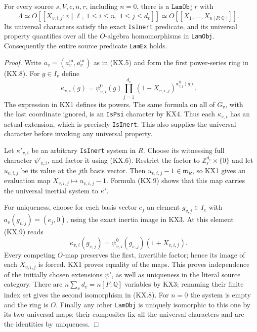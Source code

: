 \begin{theorem}
\label{claim:KX5}
For every source $s,V,c,n,r$, including $n=0$, there is a
$\texttt{LamObj}\,r$ with
\[
 \Lambda\simeq O[[X_{v,i,j}:v\mid\ell,\ 1\le i\le n,
                                      \ 1\le j\le d_v]]
       \simeq O[[X_1,\ldots,X_{n[F:\mathbb Q]}]].
                                                               \tag{KX.8}
\]
Its universal characters satisfy the exact \texttt{IsInert}
predicate, and its universal property quantifies over all the
$O$-algebra homomorphisms in \texttt{LamObj}.
Consequently the entire source predicate \texttt{LamEx} holds.
\end{theorem}
\begin{proof}
Write $a_v=(a_v^{\mathrm{in}},a_v^{\mathrm{ur}})$ as in (KX.5)
and form the first power-series ring in (KX.8).  For $g\in I_v$
define
\[
 \kappa_{v,i}(g)=\psi^0_{v,i}(g)
                    \prod_{j=1}^{d_v}(1+X_{v,i,j})^{
                                                   a^{\mathrm{in}}_{v,j}(g)}.
                                                               \tag{KX.9}
\]
The expression in KX1 defines its powers.  The same formula on all
of $G_v$, with the last coordinate ignored, is an \texttt{IsPsi}
character by KX4.  Thus each $\kappa_{v,i}$ has an actual extension,
which is precisely \texttt{IsInert}.  This also supplies the
universal character before invoking any universal property.

Let $\kappa'_{v,i}$ be an arbitrary \texttt{IsInert} system in
$R$.  Choose its witnessing full character $\psi'_{v,i}$, and
factor it using (KX.6).  Restrict the factor to
$\mathbb Z_\ell^{d_v}\times\{0\}$ and let $u_{v,i,j}$ be its
value at the $j$th basis vector.  Then
$u_{v,i,j}-1\in\mathfrak m_R$, so KX1 gives an evaluation map
$X_{v,i,j}\mapsto u_{v,i,j}-1$.  Formula (KX.9) shows that this
map carries the universal inertial system to $\kappa'$.

For uniqueness, choose for each basis vector $e_j$ an element
$g_{v,j}\in I_v$ with $a_v(g_{v,j})=(e_j,0)$, using the exact
inertia image in KX3.  At this element (KX.9) reads
\[
       \kappa_{v,i}(g_{v,j})
                   =\psi^0_{v,i}(g_{v,j})(1+X_{v,i,j}).
                                                               \tag{KX.10}
\]
Every competing $O$-map preserves the first, invertible factor;
hence its image of each $X_{v,i,j}$ is forced.  KX1 proves equality
of the maps.  This proves independence of the initially chosen
extensions $\psi'$, as well as uniqueness in the literal source
category.  There are $n\sum_vd_v=n[F:\mathbb Q]$ variables by
KX3; renaming their finite index set gives the second isomorphism
in (KX.8).  For $n=0$ the system is empty and the ring is $O$.
Finally any other \texttt{LamObj} is uniquely isomorphic to this
one by its two universal maps; their composites fix all the
universal characters and are the identities by uniqueness.
\end{proof}

